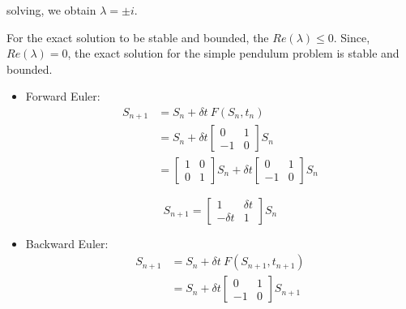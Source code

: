 \documentclass[a4paper,11pt]{report}
\begin{document}
\begin{enumerate}
    solving, we obtain $\lambda = \pm i$.

    For the exact solution to be stable and bounded, the $Re(\lambda) \le 0$. 
    Since, $Re(\lambda) = 0$, the exact solution for the simple pendulum 
    problem is stable and bounded.

    \begin{itemize}
    \item Forward Euler:
    \begin{equation*}
    \begin{aligned}
    S_{n+1} &= S_{n} + \delta t\ F(S_{n}, t_{n}) \\
            &= S_{n} + \delta t \begin{bmatrix} 0 & 1 \\ -1 & 0 \end{bmatrix} 
    S_{n} \\
            &= \begin{bmatrix} 1 & 0 \\ 0 & 1 \end{bmatrix} S_{n} + \delta t 
    \begin{bmatrix} 0 & 1 \\ -1 & 0 \end{bmatrix} S_{n}
    \end{aligned}
    \end{equation*} 

    \begin{equation*}
    S_{n+1} = \begin{bmatrix} 1 & \delta t \\ -\delta t & 1 \end{bmatrix} S_{n}
    \end{equation*}
    
    \vspace{1cm}

    \item Backward Euler:
    \begin{equation*}
    \begin{aligned}
    S_{n+1} &= S_{n} + \delta t\ F(S_{n+1}, t_{n+1}) \\
            &= S_{n} + \delta t \begin{bmatrix} 0 & 1 \\ -1 & 0 \end{bmatrix} 
    S_{n+1}
    \end{aligned}
    \end{equation*}


\end{itemize}
\end{enumerate}
\end{document}
